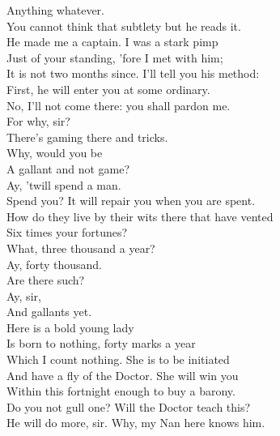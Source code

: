 \documentclass[a4paper,oneside,12pt]{memoir}
\begin{document}
\begin{drama*}
\facespeaks {} Anything whatever.\\
You cannot think that subtlety but he reads it.\\
He made me a captain. I was a stark pimp\\
Just of your standing, 'fore I met with him;\\
It is not two months since. I'll tell you his method:\\
First, he will enter you at some ordinary.\\
\kastrilspeaks No, I'll not come there: you shall pardon me.\\
\facespeaks {} For why, sir?\\
\kastrilspeaks There's gaming there and tricks.\\
\facespeaks {} Why, would you be\\
A gallant and not game?\\
\kastrilspeaks {} Ay, 'twill spend a man.\\
\facespeaks Spend you? It will repair you when you are spent.\\
How do they live by their wits there that have vented\\
Six times your fortunes?\\
\kastrilspeaks {} What, three thousand a year?\\
\facespeaks Ay, forty thousand.\\
\kastrilspeaks {} Are there such?\\
\facespeaks {} Ay, sir,\\
And gallants yet.\\
 Here is a bold young lady\\
Is born to nothing, forty marks a year\\
Which I count nothing. She is to be initiated\\
And have a fly of the Doctor. She will win you\\
Within this fortnight enough to buy a barony.\\
\kastrilspeaks Do you not gull one?  Will the Doctor teach this?\\
\facespeaks He will do more, sir. Why, my Nan here knows him.\\

\end{drama*}
\end{document}
